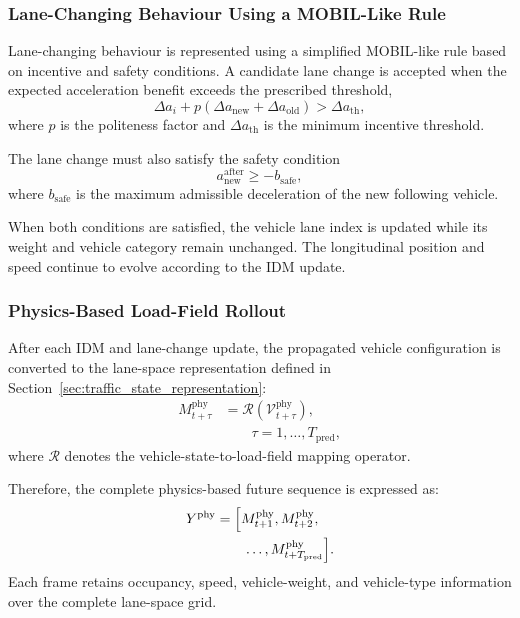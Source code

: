 \documentclass[journal]{IEEEtran}
\begin{document}
\subsubsection{Lane-Changing Behaviour Using a MOBIL-Like Rule}

Lane-changing behaviour is represented using a simplified MOBIL-like rule based on incentive and safety conditions. A candidate lane change is accepted when the expected acceleration benefit exceeds the prescribed threshold,
\begin{equation}
\Delta a_i+p\left(\Delta a_{\mathrm{new}}+\Delta a_{\mathrm{old}}\right)>\Delta a_{\mathrm{th}},
\end{equation}
where $p$ is the politeness factor and $\Delta a_{\mathrm{th}}$ is the minimum incentive threshold.

The lane change must also satisfy the safety condition
\begin{equation}
a_{\mathrm{new}}^{\mathrm{after}}\geq-b_{\mathrm{safe}},
\end{equation}
where $b_{\mathrm{safe}}$ is the maximum admissible deceleration of the new following vehicle.

When both conditions are satisfied, the vehicle lane index is updated while its weight and vehicle category remain unchanged. The longitudinal position and speed continue to evolve according to the IDM update.

\subsubsection{Physics-Based Load-Field Rollout}

After each IDM and lane-change update, the propagated vehicle configuration is converted to the lane-space representation defined in Section~\ref{sec:traffic_state_representation}:
\begin{equation}
\begin{aligned}
M_{t+\tau}^{\mathrm{phy}}&=\mathcal{R}\left(\mathcal{V}_{t+\tau}^{\mathrm{phy}}\right),\\
&\qquad\tau=1,\ldots,T_{\mathrm{pred}},
\end{aligned}
\end{equation}
where $\mathcal{R}$ denotes the vehicle-state-to-load-field mapping operator.

Therefore, the complete physics-based future sequence is expressed as:
\begin{equation}
\begin{aligned}
Y^{\mathrm{phy}}&=\Bigl[M_{t+1}^{\mathrm{phy}},M_{t+2}^{\mathrm{phy}},\\
&\qquad\ldots,M_{t+T_{\mathrm{pred}}}^{\mathrm{phy}}\Bigr].
\end{aligned}
\end{equation}
Each frame retains occupancy, speed, vehicle-weight, and vehicle-type information over the complete lane-space grid.
\end{document}
